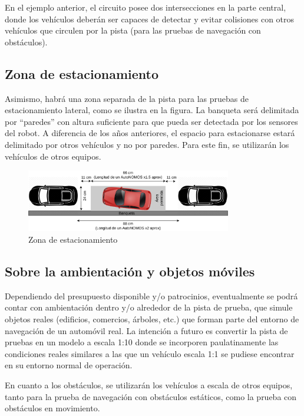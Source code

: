 \documentclass[letterpaper,12pt]{article}
\begin{document}
En el ejemplo anterior, el circuito posee dos intersecciones en la parte central, donde los vehículos deberán ser capaces de detectar y evitar colisiones con otros vehículos que circulen por la pista (para las pruebas de navegación con obstáculos). 

\subsection{Zona de estacionamiento}
Asimismo, habrá una zona separada de la pista para las pruebas de estacionamiento lateral, como se ilustra en la figura. La banqueta será delimitada por “paredes” con altura suficiente para que pueda ser detectada por los sensores del robot. A diferencia de los años anteriores, el espacio para estacionarse estará delimitado por otros vehículos y no por paredes. Para este fin, se utilizarán los vehículos de otros equipos.
\begin{figure}
  \centering
  \includegraphics[width=0.8\textwidth]{Figures/Parking.pdf}
  \caption{Zona de estacionamiento}
  \label{fig:Parking}
\end{figure}

\subsection{Sobre la ambientación y objetos móviles}
Dependiendo del presupuesto disponible y/o patrocinios, eventualmente se podrá contar con ambientación dentro y/o alrededor de la pista de prueba, que simule objetos reales (edificios, comercios, árboles, etc.) que forman parte del entorno de navegación de un automóvil real. La intención a futuro es convertir la pista de pruebas en un modelo a escala 1:10 donde se incorporen paulatinamente las condiciones reales similares a las que un vehículo escala 1:1 se pudiese encontrar en su entorno normal de operación.

En cuanto a los obstáculos, se utilizarán los vehículos a escala de otros equipos, tanto para la prueba de navegación con obstáculos estáticos, como la prueba con obstáculos en movimiento.

\end{document}
